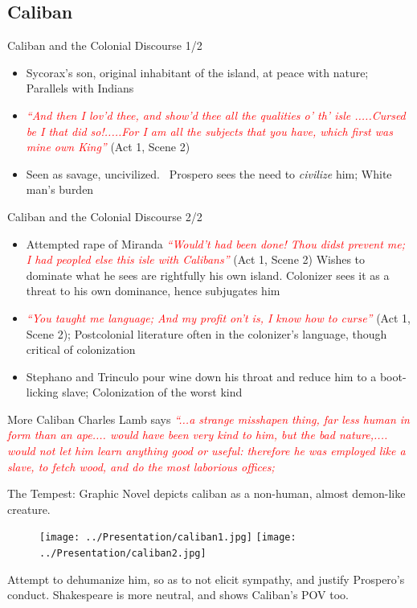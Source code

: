 \documentclass{beamer}
\begin{document}
\subsection{Caliban}
  \begin{frame}{Caliban and the Colonial Discourse 1/2}
    \begin{itemize}
    \item Sycorax's son, original inhabitant of the island, at peace with nature; Parallels with Indians
    \item \textcolor{red}{\emph{``And then I lov'd thee, and show'd thee all the qualities o' th' isle .....Cursed be I that did so!.....For I am all the subjects that you have, which first was mine own King''}} (Act 1, Scene 2)
    \item Seen as savage, uncivilized.~\cite{1989} Prospero sees the need to \emph{civilize} him; White man's burden
    \end{itemize}
  \end{frame}
  \begin{frame}{Caliban and the Colonial Discourse 2/2}
    \begin{itemize}
    \item Attempted rape of Miranda \textcolor{red}{\emph{``Would't had been done! Thou didst prevent me; I had peopled else this isle with Calibans''}} (Act 1, Scene 2) Wishes to dominate what he sees are rightfully his own island. Colonizer sees it as a threat to his own dominance, hence subjugates him
    \item \textcolor{red}{\emph{``You taught me language; And my profit on't is, I know how to curse''}} (Act 1, Scene 2); Postcolonial literature often in the colonizer's language, though critical of colonization
    \item Stephano and Trinculo pour wine down his throat and reduce him to a boot-licking slave; Colonization of the worst kind
    \end{itemize}
  \end{frame}

  \begin{frame}{More Caliban}
      Charles Lamb says \textcolor{red}{\emph{``...a strange misshapen thing, far less human in form than an ape.... would have been very kind to him, but the bad nature,.... would not let him learn anything good or useful: therefore he was employed like a slave, to fetch wood, and do the most laborious offices;}}

        The Tempest: Graphic Novel depicts caliban as a non-human, almost demon-like creature. 

        \begin{figure}[htp]
          \begin{center}
            \centering
            \texttt{[image: ../Presentation/caliban1.jpg]}
            \texttt{[image: ../Presentation/caliban2.jpg]}
          \end{center}
        \end{figure}

        Attempt to dehumanize him, so as to not elicit sympathy, and justify Prospero's conduct. Shakespeare is more neutral, and shows Caliban's POV too.
  \end{frame}
\end{document}
